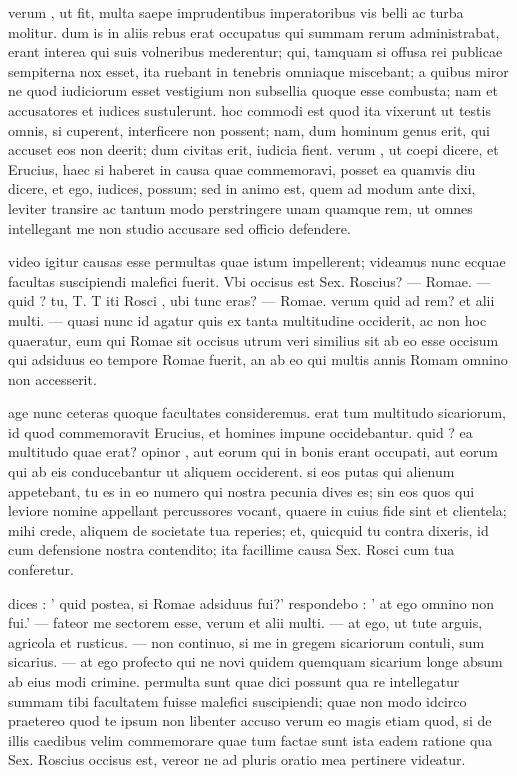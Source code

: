  verum , ut fit, multa saepe imprudentibus imperatoribus vis belli ac turba molitur. dum is in aliis rebus erat occupatus qui summam rerum administrabat, erant interea qui suis volneribus mederentur; qui, tamquam si offusa rei publicae sempiterna nox esset, ita ruebant in tenebris omniaque miscebant; a quibus miror ne quod iudiciorum esset vestigium non subsellia quoque esse combusta; nam et accusatores et iudices sustulerunt. hoc commodi est quod ita vixerunt ut testis omnis, si cuperent, interficere non possent; nam, dum hominum genus erit, qui accuset eos non deerit; dum civitas erit, iudicia fient. verum , ut coepi dicere, et Erucius, haec si haberet in causa quae commemoravi, posset ea quamvis diu dicere, et ego, iudices, possum; sed in animo est, quem ad modum ante dixi, leviter transire ac tantum modo perstringere unam quamque rem, ut omnes intellegant me non studio accusare sed officio defendere.

 video igitur causas esse permultas quae istum impellerent; videamus nunc ecquae facultas suscipiendi malefici fuerit. Vbi occisus est Sex. Roscius? — Romae. — quid ? tu, T. T iti Rosci , ubi tunc eras? — Romae. verum quid ad rem? et alii multi. — quasi nunc id agatur quis ex tanta multitudine occiderit, ac non hoc quaeratur, eum qui Romae sit occisus utrum veri similius sit ab eo esse occisum qui adsiduus eo tempore Romae fuerit, an ab eo qui multis annis Romam omnino non accesserit.

 age nunc ceteras quoque facultates consideremus. erat tum multitudo sicariorum, id quod commemoravit Erucius, et homines impune occidebantur. quid ? ea multitudo quae erat? opinor , aut eorum qui in bonis erant occupati, aut eorum qui ab eis conducebantur ut aliquem occiderent. si eos putas qui alienum appetebant, tu es in eo numero qui nostra pecunia dives es; sin eos quos qui leviore nomine appellant percussores vocant, quaere in cuius fide sint et clientela; mihi crede, aliquem de societate tua reperies; et, quicquid tu contra dixeris, id cum defensione nostra contendito; ita facillime causa Sex. Rosci cum tua conferetur.

 dices : ' quid postea, si Romae adsiduus fui?' respondebo : ' at ego omnino non fui.' — fateor me sectorem esse, verum et alii multi. — at ego, ut tute arguis, agricola et rusticus. — non continuo, si me in gregem sicariorum contuli, sum sicarius. — at ego profecto qui ne novi quidem quemquam sicarium longe absum ab eius modi crimine. permulta sunt quae dici possunt qua re intellegatur summam tibi facultatem fuisse malefici suscipiendi; quae non modo idcirco praetereo quod te ipsum non libenter accuso verum eo magis etiam quod, si de illis caedibus velim commemorare quae tum factae sunt ista eadem ratione qua Sex. Roscius occisus est, vereor ne ad pluris oratio mea pertinere videatur.

